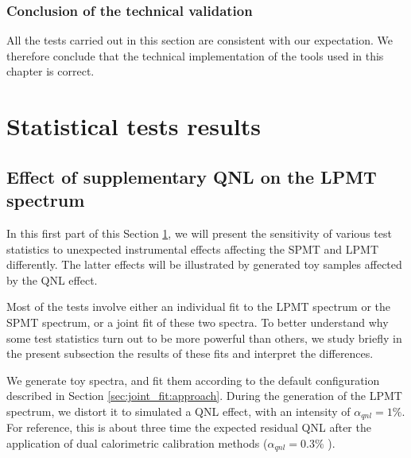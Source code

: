 \documentclass[../main.tex]{subfiles}
\begin{document}
\subsubsection{Conclusion of the technical validation}

All the tests carried out in this section are consistent with our expectation. We therefore conclude that the technical implementation of the tools used in this chapter is correct.



%
%
\section{Statistical tests results}
\label{sec:joint_fit:results}

\subsection{Effect of supplementary QNL on the LPMT spectrum}

In this first part of this Section \ref{sec:joint_fit:results}, we will present the sensitivity of various test statistics to unexpected instrumental effects affecting the SPMT and LPMT differently. The latter effects will be illustrated by generated toy samples affected by the QNL effect.

Most of the tests involve either an individual fit to the LPMT spectrum or the SPMT spectrum, or a joint fit of these two spectra. To better understand why some test statistics turn out to be more powerful than others, we study briefly in the present subsection the results of these fits and interpret the differences.

We generate toy spectra, and fit them according to the default configuration described in Section \ref{sec:joint_fit:approach}.
During the generation of the LPMT spectrum, we distort it to simulated a QNL effect, with an intensity of $\alpha_{qnl}=1\%$. For reference, this is about three time the expected residual QNL after
the application of dual calorimetric calibration methods ($\alpha_{qnl} = 0.3\%$ \cite{juno_collaboration_calibration_2021}).
\end{document}
